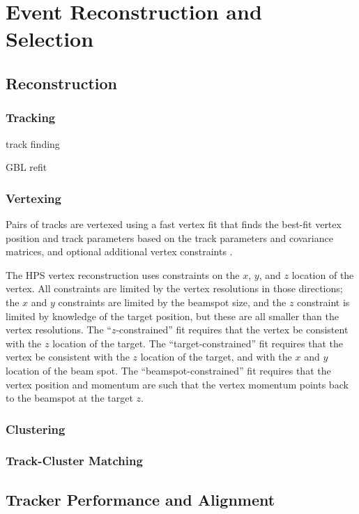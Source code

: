 \chapter{Event Reconstruction and Selection}
\section{Reconstruction}
\subsection{Tracking}
\label{sec:track_recon}
track finding

GBL refit

\subsection{Vertexing}
\label{sec:vertex_recon}
Pairs of tracks are vertexed using a fast vertex fit that finds the best-fit vertex position and track parameters based on the track parameters and covariance matrices, and optional additional vertex constraints \cite{billoir_fast_1992}.

The HPS vertex reconstruction uses constraints on the $x$, $y$, and $z$ location of the vertex.
All constraints are limited by the vertex resolutions in those directions; the $x$ and $y$ constraints are limited by the beamspot size, and the $z$ constraint is limited by knowledge of the target position, but these are all smaller than the vertex resolutions.
The ``$z$-constrained'' fit requires that the vertex be consistent with the $z$ location of the target.
The ``target-constrained'' fit requires that the vertex be consistent with the $z$ location of the target, and with the $x$ and $y$ location of the beam spot.
The ``beamspot-constrained'' fit requires that the vertex position and momentum are such that the vertex momentum points back to the beamspot at the target $z$.

\subsection{Clustering}
\label{sec:clustering}

\subsection{Track-Cluster Matching}
\label{sec:matching}
\section{Tracker Performance and Alignment}
